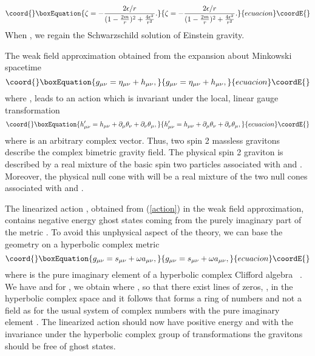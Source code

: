 \documentclass[a4paper,10pt]{article}
\begin{document}
\begin{equation}\coord{}\boxEquation{
\zeta=-\frac{2\epsilon/r}{(1-\frac{2m}{r})^2+\frac{4\epsilon^2}{r^2}}.
}{
\zeta=-\frac{2\epsilon/r}{(1-\frac{2m}{r})^2+\frac{4\epsilon^2}{r^2}}.
}{ecuacion}\coordE{}\end{equation}
When \coordHE{}, we regain the Schwarzschild solution of Einstein
gravity.

The weak field approximation obtained from the expansion about Minkowski
spacetime
\begin{equation}\coord{}\boxEquation{
g_{\mu\nu}=\eta_{\mu\nu}+h_{\mu\nu},
}{
g_{\mu\nu}=\eta_{\mu\nu}+h_{\mu\nu},
}{ecuacion}\coordE{}\end{equation}
where \coordHE{}, leads to an action
which is invariant under the local, linear gauge transformation
\begin{equation}\coord{}\boxEquation{
h^\prime_{\mu\nu}=h_{\mu\nu}+\partial_\mu\theta_\nu+\partial_\nu\theta_\mu,
}{
h^\prime_{\mu\nu}=h_{\mu\nu}+\partial_\mu\theta_\nu+\partial_\nu\theta_\mu,
}{ecuacion}\coordE{}\end{equation}
where \myHighlight{$\theta_\mu$}\coordHE{} is an arbitrary complex vector. Thus, two spin 2 massless
gravitons describe the complex bimetric gravity field. The physical spin 2 graviton
is described by a real mixture of the basic spin two particles associated with
\coordHE{} and \coordHE{}. Moreover, the physical null cone with
\coordHE{} will be a real mixture of the two null cones associated with
\coordHE{} and \coordHE{}.

The linearized action \coordHE{}, obtained from (\ref{action})
in the weak field approximation, contains negative energy ghost states
coming from the purely imaginary part of the metric \coordHE{}. To avoid
this unphysical aspect of the theory, we can base the geometry on a
hyperbolic complex metric
\begin{equation}\coord{}\boxEquation{
g_{\mu\nu}=s_{\mu\nu}+\omega a_{\mu\nu},
}{
g_{\mu\nu}=s_{\mu\nu}+\omega a_{\mu\nu},
}{ecuacion}\coordE{}\end{equation}
where \myHighlight{$\omega$}\coordHE{} is the pure imaginary element of a hyperbolic complex
Clifford algebra \myHighlight{$\Omega$}\coordHE{}~\cite{Clifford}. We have \coordHE{} and for
\coordHE{}, we obtain \coordHE{} where \coordHE{}, so that there exist lines of zeros, \coordHE{}, in the hyperbolic
complex space and it follows that \myHighlight{$\Omega$}\coordHE{} forms a ring of numbers and not
a field as for the usual system of complex numbers with the pure imaginary
element \coordHE{}. The linearized action \coordHE{} should now have
positive energy and with the invariance under the hyperbolic complex group
of transformations \coordHE{} the gravitons should be free of ghost
states.
\end{document}

